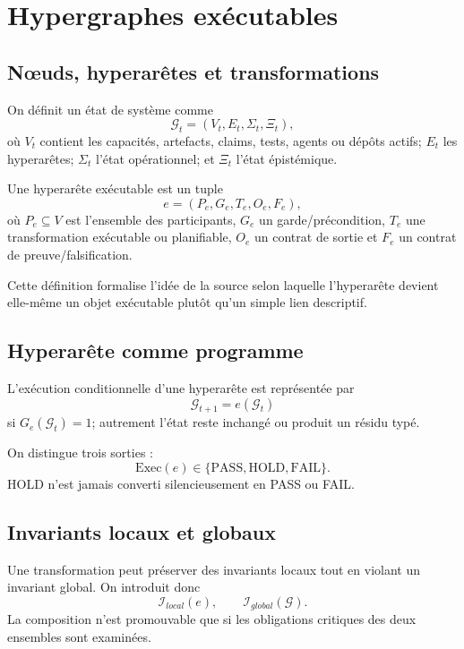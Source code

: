 \chapter{Hypergraphes exécutables}

\section{Nœuds, hyperarêtes et transformations}

On définit un état de système comme
\[
\mathcal G_t=(V_t,E_t,\Sigma_t,\Xi_t),
\]
où $V_t$ contient les capacités, artefacts, claims, tests, agents ou dépôts actifs; $E_t$ les hyperarêtes; $\Sigma_t$ l'état opérationnel; et $\Xi_t$ l'état épistémique.

\begin{definition}
Une hyperarête exécutable est un tuple
\[
e=(P_e,G_e,T_e,O_e,F_e),
\]
où $P_e\subseteq V$ est l'ensemble des participants, $G_e$ un garde/précondition, $T_e$ une transformation exécutable ou planifiable, $O_e$ un contrat de sortie et $F_e$ un contrat de preuve/falsification.
\end{definition}

Cette définition formalise l'idée de la source selon laquelle l'hyperarête devient elle-même un objet exécutable plutôt qu'un simple lien descriptif.

\section{Hyperarête comme programme}

L'exécution conditionnelle d'une hyperarête est représentée par
\[
\mathcal G_{t+1}=e(\mathcal G_t)
\]
si $G_e(\mathcal G_t)=1$; autrement l'état reste inchangé ou produit un résidu typé.

On distingue trois sorties :
\[
\mathrm{Exec}(e)\in\{\mathrm{PASS},\mathrm{HOLD},\mathrm{FAIL}\}.
\]
HOLD n'est jamais converti silencieusement en PASS ou FAIL.

\section{Invariants locaux et globaux}

Une transformation peut préserver des invariants locaux tout en violant un invariant global. On introduit donc
\[
\mathcal I_{local}(e),\qquad \mathcal I_{global}(\mathcal G).
\]
La composition n'est promouvable que si les obligations critiques des deux ensembles sont examinées.

